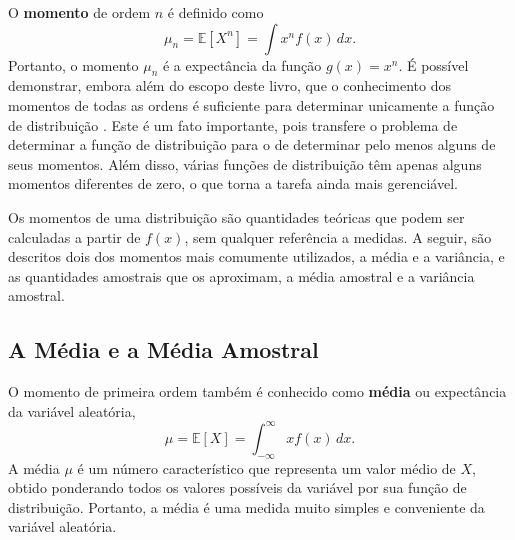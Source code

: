 O \textbf{momento} de ordem $n$ é definido como
\begin{equation}
\mu_n = \mathbb{E}[X^n] =  \int x^n f(x)\, dx.
\end{equation}
Portanto, o momento $\mu_n$ é a expectância da função $g(x) = x^n$. É possível demonstrar, embora além do escopo deste livro, que o conhecimento dos momentos de todas as ordens é suficiente para determinar unicamente a função de distribuição \citep{wilks1947mathematical}. Este é um fato importante, pois transfere o problema de determinar a função de distribuição para o de determinar pelo menos alguns de seus momentos. Além disso, várias funções de distribuição têm apenas alguns momentos diferentes de zero, o que torna a tarefa ainda mais gerenciável.

Os momentos de uma distribuição são quantidades teóricas que podem ser calculadas a partir de  $f(x)$, sem qualquer referência a medidas. A seguir, são descritos dois dos momentos mais comumente utilizados, a média e a variância, e as quantidades amostrais que os aproximam, a média amostral e a variância amostral.

\subsection{A Média e a Média Amostral}

O momento de primeira ordem também é conhecido como \textbf{média} ou expectância da variável aleatória,
\begin{equation}
	\mu = \mathbb{E}[X] = \int_{-\infty}^{\infty} x f(x)\, dx.
\end{equation}
A média $\mu$ é um número característico que representa um valor médio de $X$, obtido ponderando todos os valores possíveis da variável por sua função de distribuição. Portanto, a média é uma medida muito simples e conveniente da variável aleatória.

